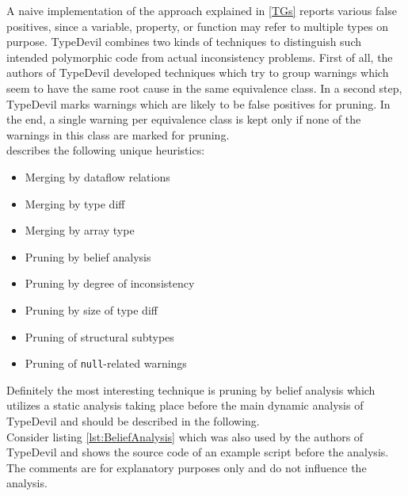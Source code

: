 \documentclass[runningheads,a4paper]{llncs}
\begin{document}
A naive implementation of the approach explained in \ref{TGs} reports various false positives, since a variable, property, or function may refer to multiple types on purpose. 
TypeDevil combines two kinds of techniques to distinguish such intended polymorphic code from actual inconsistency problems. 
First of all, the authors of TypeDevil developed techniques which try to group warnings which seem to have the same root cause in the same equivalence class.
In a second step, TypeDevil marks warnings which are likely to be false positives for pruning.
In the end, a single warning per equivalence class is kept only if none of the warnings in this class are marked for pruning.\\
\cite{DBLP:conf/icse/PradelSS15} describes the following unique heuristics:
\begin{itemize}
    \item Merging by dataflow relations
    \item Merging by type diff
    \item Merging by array type
    \item Pruning by belief analysis
    \item Pruning by degree of inconsistency
    \item Pruning by size of type diff
    \item Pruning of structural subtypes
    \item Pruning of \lstinline[columns=fixed]{null}-related warnings
  \end{itemize}
Definitely the most interesting technique is pruning by belief analysis which utilizes a static analysis taking place before the main dynamic analysis of TypeDevil and should be described in the following.\\
Consider listing \ref{lst:BeliefAnalysis} which was also used by the authors of TypeDevil \cite{DBLP:conf/icse/PradelSS15} and shows the source code of an example script before the analysis. The comments are for explanatory purposes only and do not influence the analysis.
\end{document}
